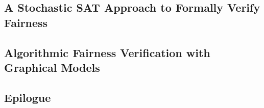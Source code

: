 \begin{mainmatter}
	\chapter{A Stochastic SAT Approach to Formally Verify Fairness}
	
	
	
	
	

	\chapter{Algorithmic Fairness Verification with Graphical Models}
	
	
	
	
	
	
					
%	
%	
%	
%	
%		

	
	
\end{mainmatter}


\begin{backmatter}
	\part{Epilogue}
	
	\printbibliography[heading=bibintoc]
\end{backmatter}

\appendix
%
%
%


